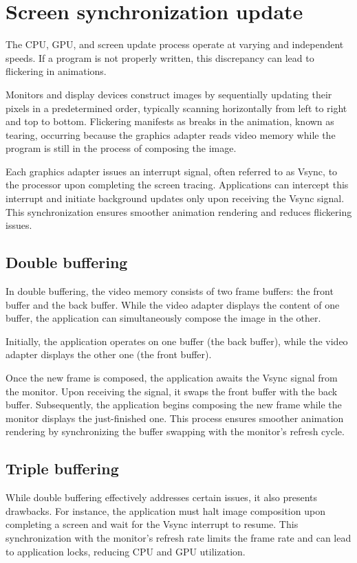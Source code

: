 \section{Screen synchronization update}

The CPU, GPU, and screen update process operate at varying and independent speeds. 
If a program is not properly written, this discrepancy can lead to flickering in animations.

Monitors and display devices construct images by sequentially updating their pixels in a predetermined order, typically scanning horizontally from left to right and top to bottom. 
Flickering manifests as breaks in the animation, known as tearing, occurring because the graphics adapter reads video memory while the program is still in the process of composing the image.

Each graphics adapter issues an interrupt signal, often referred to as Vsync, to the processor upon completing the screen tracing.
Applications can intercept this interrupt and initiate background updates only upon receiving the Vsync signal. 
This synchronization ensures smoother animation rendering and reduces flickering issues.

\subsection{Double buffering}
In double buffering, the video memory consists of two frame buffers: the front buffer and the back buffer. 
While the video adapter displays the content of one buffer, the application can simultaneously compose the image in the other.

Initially, the application operates on one buffer (the back buffer), while the video adapter displays the other one (the front buffer).

Once the new frame is composed, the application awaits the Vsync signal from the monitor. Upon receiving the signal, it swaps the front buffer with the back buffer. 
Subsequently, the application begins composing the new frame while the monitor displays the just-finished one. 
This process ensures smoother animation rendering by synchronizing the buffer swapping with the monitor's refresh cycle.

\subsection{Triple buffering}
While double buffering effectively addresses certain issues, it also presents drawbacks.
For instance, the application must halt image composition upon completing a screen and wait for the Vsync interrupt to resume. 
This synchronization with the monitor's refresh rate limits the frame rate and can lead to application locks, reducing CPU and GPU utilization.

